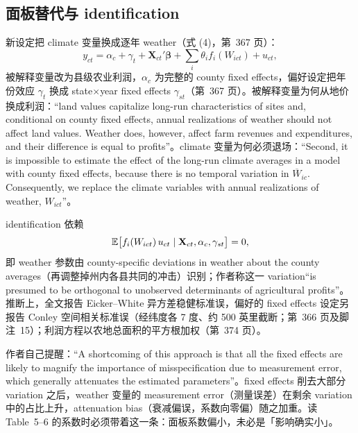 \subsection{面板替代与 identification}

新设定把 climate 变量换成逐年 weather（式 (4)，第~367 页）：
\begin{equation}
y_{ct} = \alpha_c + \gamma_t + \mathbf{X}_{ct}'\boldsymbol{\beta} + \sum_i \theta_i f_i(W_{ict}) + u_{ct},
\label{eq:dg-panel}
\end{equation}
被解释变量改为县级农业利润，$\alpha_c$ 为完整的 county fixed effects，偏好设定把年份效应 $\gamma_t$ 换成 state$\times$year fixed effects $\gamma_{st}$（第~367 页）。被解释变量为何从地价换成利润：``land values capitalize long-run characteristics of sites and, conditional on county fixed effects, annual realizations of weather should not affect land values. Weather does, however, affect farm revenues and expenditures, and their difference is equal to profits''\citep[第~367 页]{deschenes2007economic}。climate 变量为何必须退场：``Second, it is impossible to estimate the effect of the long-run climate averages in a model with county fixed effects, because there is no temporal variation in $\overline{W}_{ic}$. Consequently, we replace the climate variables with annual realizations of weather, $W_{ict}$''\citep[第~367 页]{deschenes2007economic}。

identification 依赖
\begin{equation*}
\mathbb{E}\bigl[f_i(W_{ict})\,u_{ct} \mid \mathbf{X}_{ct}, \alpha_c, \gamma_{st}\bigr] = 0 ,
\end{equation*}
即 weather 参数由 county-specific deviations in weather about the county averages（再调整掉州内各县共同的冲击）识别；作者称这一 variation``is presumed to be orthogonal to unobserved determinants of agricultural profits''\citep[第~357、367 页]{deschenes2007economic}。推断上，全文报告 Eicker--White 异方差稳健标准误，偏好的 fixed effects 设定另报告 Conley 空间相关标准误（经纬度各 7 度、约 500 英里截断；第~366 页及脚注~15）；利润方程以农地总面积的平方根加权（第~374 页）。

\begin{pitfall}
\label{pit:dg-attenuation}
作者自己提醒：``A shortcoming of this approach is that all the fixed effects are likely to magnify the importance of misspecification due to measurement error, which generally attenuates the estimated parameters''\citep[第~367 页]{deschenes2007economic}。fixed effects 削去大部分 variation 之后，weather 变量的 measurement error（测量误差）在剩余 variation 中的占比上升，attenuation bias（衰减偏误，系数向零偏）随之加重。读 Table~5--6 的系数时必须带着这一条：面板系数偏小，未必是「影响确实小」。
\end{pitfall}

